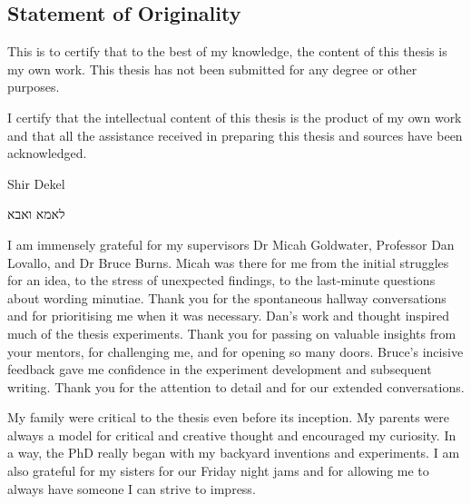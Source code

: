 \documentclass[a4paper, nobind]{templates/ociamthesis}
\newenvironment{originality}%
{   \begin{alwayssingle}\chapter*{Statement of Originality}
    \thispagestyle{empty}
    \pagestyle{empty}
    \setlength{\baselineskip}{\frontmatterbaselineskip}
  }
  {\end{alwayssingle}}
\theoremstyle{definition}
\theoremstyle{definition}
\theoremstyle{definition}
\theoremstyle{definition}
\theoremstyle{remark}
\begin{document}
\begin{romanpages}

\maketitle

\begin{originality}
 	This is to certify that to the best of my knowledge, the content of this thesis
  is my own work. This thesis has not been submitted for any degree or other
  purposes.

  I certify that the intellectual content of this thesis is the product of my own
  work and that all the assistance received in preparing this thesis and sources
  have been acknowledged.

  \vspace{3cm}

  Shir Dekel
\end{originality}

\begin{dedication}
  \foreignlanguage{hebrew}{לאמא ואבא}
\end{dedication}

\begin{acknowledgements}
 	I am immensely grateful for my supervisors Dr Micah Goldwater, Professor Dan
  Lovallo, and Dr Bruce Burns. Micah was there for me from the initial struggles
  for an idea, to the stress of unexpected findings, to the last-minute questions
  about wording minutiae. Thank you for the spontaneous hallway conversations and
  for prioritising me when it was necessary. Dan's work and thought inspired much
  of the thesis experiments. Thank you for passing on valuable insights from your
  mentors, for challenging me, and for opening so many doors. Bruce's incisive
  feedback gave me confidence in the experiment development and subsequent
  writing. Thank you for the attention to detail and for our extended
  conversations.

  My family were critical to the thesis even before its inception. My parents were
  always a model for critical and creative thought and encouraged my curiosity.
  In a way, the PhD really began with my backyard inventions and experiments. I am
  also grateful for my sisters for our Friday night jams and for allowing me to
  always have someone I can strive to impress.


\end{acknowledgements}
\end{romanpages}
\end{document}
